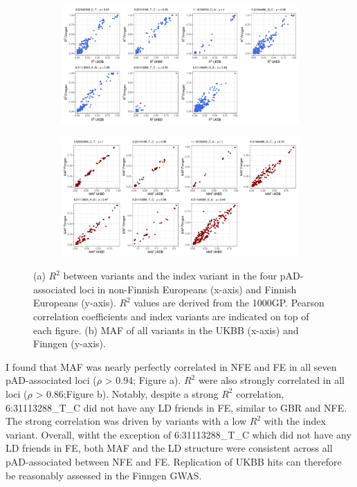 \begin{figure}[H]
  \centering
  \begin{subfigure}[b]{1.0\textwidth}
      \centering
      \includegraphics[width=\textwidth]{ukbb_finngen_ld_plot}
      \caption{}
      \label{fig:ukbb_finngen_ld_plot}
  \end{subfigure}
  \hfill
  \begin{subfigure}[b]{1.0\textwidth}
      \centering
      \includegraphics[width=\textwidth]{ukbb_finngen_maf_plot}
      \caption{}
      \label{fig:ukbb_finngen_maf_plot}
  \end{subfigure}


     \caption{(a) $R^{2}$ between variants and the index variant in the four pAD-associated loci in non-Finnish Europeans (x-axis) and Finnish Europeans (y-axis). $R^{2}$ values are derived from the 1000GP. Pearson correlation coefficients and index variants are indicated on top of each figure. (b) MAF of all variants in the UKBB (x-axis) and Finngen (y-axis).}
     \label{fig:tss_esqtl}
\end{figure}
I found that MAF was nearly perfectly correlated in NFE and FE in all seven pAD-associated loci ($\rho$ > 0.94; Figure a). $R^{2}$ were also strongly correlated in all loci ($\rho$ > 0.86;Figure b). Notably, despite a strong $R^{2}$ correlation, 6:31113288\_T\_C did not have any LD friends in FE, similar to GBR and NFE. The strong correlation was driven by variants with a low $R^{2}$ with the index variant. Overall, witht the exception of 6:31113288\_T\_C which did not have any LD friends in FE, both MAF and the LD structure were consistent across all pAD-associated between NFE and FE. Replication of UKBB hits can therefore be reasonably assessed in the Finngen GWAS.\\

